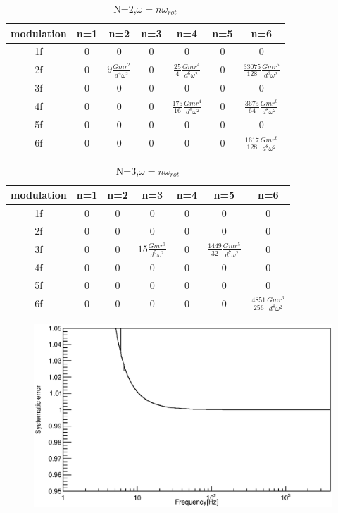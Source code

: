 \documentclass[A4]{spie}  %
\begin{document}
\begin{table}
\begin{center}
\caption{N=2,$\omega=n\omega_{rot}$ \label{pcal}}
\footnotesize
\begin{tabular}{ccccccc}
\hline
modulation& n=1 & n=2& n=3 &n=4&n=5&n=6 \\
\hline
1f&0&0&0&0&0&0 \\
2f&0&$9 \frac{Gmr^2}{d^4\omega^2}$&0&$\frac{25}{4} \frac{Gmr^4}{d^6\omega^2}$&0&$\frac{33075}{128} \frac{Gmr^6}{d^8\omega^2}$  \\
3f&0&0&0&0&0&0\\
4f&0&0&0&$\frac{175}{16} \frac{Gmr^4}{d^6\omega^2}$&0& $\frac{3675}{64} \frac{Gmr^6}{d^8\omega^2}$ \\
5f&0&0&0&0&0&0 \\
6f&0&0&0&0&0&$\frac{1617}{128} \frac{Gmr^6}{d^8\omega^2}$  \\
\hline
\end{tabular}
\end{center}
\end{table}

\begin{table}
\begin{center}
\caption{N=3,$\omega=n\omega_{rot}$ \label{pcal}}
\footnotesize
\begin{tabular}{ccccccc}
\hline
modulation& n=1 & n=2& n=3 &n=4&n=5&n=6 \\
\hline
1f&0&0&0&0&0&0 \\
2f&0&0&0&0&0&0  \\
3f&0&0&$15\frac{Gmr^3}{d^5\omega^2}$&0&$\frac{1449}{32}\frac{Gmr^5}{d^7\omega^2}$&0\\
4f&0&0&0&0&0&0 \\
5f&0&0&0&0&0&0 \\
6f&0&0&0&0&0&$\frac{4851}{256} \frac{Gmr^6}{d^8\omega^2}$  \\
\hline
\end{tabular}
\end{center}
\end{table}

\begin{figure}
\begin{center}
\includegraphics[width=12cm]{dx_Gcal_ratio.eps}
\caption{}
\label{fig:ratio}
\end{center}
\end{figure}
\end{document}
